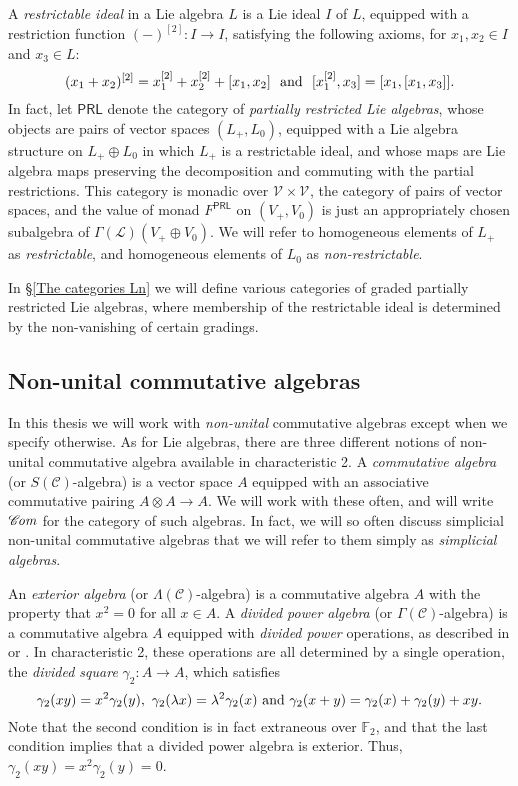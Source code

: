 \documentclass[11pt]{amsart} \renewcommand{\baselinestretch}{1.2}
\theoremstyle{plain}
\numberwithin{equation}{section} %
\theoremstyle{plain}
\numberwithin{equation}{chapter} %
\newcommand{\DASH}{\mathrm{-}}
\renewcommand{\to}{\longrightarrow}
\newcommand{\scrL}{\mathscr{L}}
\newcommand{\scrC}{\mathscr{C}}
\newcommand{\calV}{\mathcal{V}}
\newcommand{\citeBOX}[2][]{\cite[\mbox{#1}]{#2}}
\newcommand{\LieOperad}{{\scrL}}
\newcommand{\CommOperad}{{\scrC}}
\newcommand{\restn}[1]{#1^{[2]}}
\newcommand{\vect}[2]{\calV^{#1}_{#2}}
\newcommand{\F}{\mathbb{F}}
\newcommand{\algs}{{\scrC\!\textit{\normalfont\textit{om}}}}
\newcommand{\Ftwo}{\F_2}
\newcommand{\SubsectionOrSection}[1]{\subsection{#1}}
\begin{document}
\begin{Conventions and notation}
A \emph{restrictable ideal} in a Lie algebra $L$ is a Lie ideal $I$ of $L$, equipped with a restriction function $\restn{(\DASH)}:I\to I$, satisfying the following axioms, for $x_1,x_2\in I$ and $x_3\in L$:
\[\restn{(x_1+x_2)}=\restn{x_1}+\restn{x_2}+[x_1,x_2]\textup{ \ and \ }[\restn{x_1},x_3]=[x_1,[x_1,x_3]].\]
In fact, let $\mathsf{PRL}$ denote the category of \emph{partially restricted Lie algebras}, whose objects are pairs of vector spaces $(L_+,L_0)$, equipped with a Lie algebra structure on $L_+\oplus L_0$ in which $L_+$ is a restrictable ideal, and whose maps are Lie algebra maps preserving the decomposition and commuting with the partial restrictions. This category is monadic over $\vect{}{}\times\vect{}{}$, the category of pairs of vector spaces, and the value of monad $F^{\mathsf{PRL}}$  on $(V_+,V_0)$ is just an appropriately chosen subalgebra of $\Gamma(\LieOperad)(V_+\oplus V_0)$. We will refer to homogeneous elements of $L_+$ as \emph{restrictable}, and homogeneous elements of $L_0$ as \emph{non-restrictable}.

In \S\ref{The categories Ln} we will define various categories of graded partially restricted Lie algebras, where membership of the restrictable ideal is determined by the non-vanishing of certain gradings.


\SubsectionOrSection{Non-unital commutative algebras}
In this thesis we will  work with \emph{non-unital} commutative algebras except when we specify otherwise. As for Lie algebras, there are three different notions of non-unital commutative algebra available in characteristic 2. A \emph{commutative algebra} (or $S(\CommOperad)$-algebra) is a vector space $A$ equipped with an associative commutative pairing $A\otimes A\to A$.  We will work with these often, and will write $\algs$ for the category of such algebras. In fact, we will so often discuss simplicial non-unital commutative algebras that we will refer to them simply as \emph{simplicial algebras}.

An \emph{exterior algebra} (or $\Lambda(\CommOperad)$-algebra) is a commutative algebra $A$ with the property that $x^2=0$ for all $x\in A$. A \emph{divided power algebra} (or $\Gamma(\CommOperad)$-algebra) is a commutative algebra $A$ equipped with \emph{divided power} operations, as described in \citeBOX[1.2.2]{FresseSimplicialAlgs.pdf} or \citeBOX[\S2]{MR1089001}. In characteristic 2, these operations are all determined by a single operation, the \emph{divided square} $\gamma_2:A\to A$, which satisfies
\[\gamma_2(xy)=x^2\gamma_2(y),\ \gamma_2(\lambda x)=\lambda^2\gamma_2(x)\textup{ and }\gamma_2(x+y)=\gamma_2(x)+\gamma_2(y)+xy.\]
Note that the second condition is in fact extraneous over $\Ftwo $, and that the last condition implies that a divided power algebra is exterior. Thus, $\gamma_2(xy)=x^2\gamma_2(y)=0$.


\end{Conventions and notation}
\end{document}
